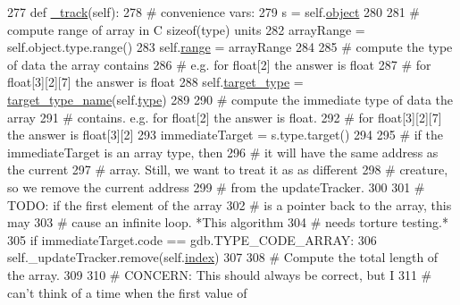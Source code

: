 \begin{DoxyCode}
277     \textcolor{keyword}{def }\hyperlink{classmemoryoracle_1_1instance_1_1Array_a1d8c3993d8a52bfbec8240d6f79b3ce1}{\_track}(self):
278         \textcolor{comment}{# convenience vars:}
279         s = self.\hyperlink{classmemoryoracle_1_1typed_1_1Typed_a0d1a3c7644d37da66f9ea5cb269115fe}{object}
280 
281         \textcolor{comment}{# compute range of array in C sizeof(type) units}
282         arrayRange = self.object.type.range()
283         self.\hyperlink{classmemoryoracle_1_1instance_1_1Array_acb456ee173f41d41e16e1bebfba48aa6}{range} = arrayRange
284 
285         \textcolor{comment}{# compute the type of data the array contains}
286         \textcolor{comment}{# e.g. for float[2] the answer is float}
287         \textcolor{comment}{# for float[3][2][7] the answer is float}
288         self.\hyperlink{classmemoryoracle_1_1instance_1_1Array_a23836ff62d41326159a9a47ad3813e38}{target\_type} = \hyperlink{namespacememoryoracle_1_1instance_a4b8eb263a612b709be51201fc0fa7b6c}{target\_type\_name}(self.\hyperlink{classmemoryoracle_1_1instance_1_1Memory_a17b9f6c0f548bf201e4fc636c133470b}{type})
289 
290         \textcolor{comment}{# compute the immediate type of data the array}
291         \textcolor{comment}{# contains.  e.g. for float[2] the answer is float.}
292         \textcolor{comment}{# for float[3][2][7] the answer is float[3][2]}
293         immediateTarget = s.type.target()
294 
295         \textcolor{comment}{# if the immediateTarget is an array type, then}
296         \textcolor{comment}{# it will have the same address as the current}
297         \textcolor{comment}{# array.  Still, we want to treat it as as different}
298         \textcolor{comment}{# creature, so we remove the current address}
299         \textcolor{comment}{# from the updateTracker.}
300 
301         \textcolor{comment}{# TODO: if the first element of the array}
302         \textcolor{comment}{# is a pointer back to the array, this may}
303         \textcolor{comment}{# cause an infinite loop.  *This algorithm}
304         \textcolor{comment}{# needs torture testing.*}
305         \textcolor{keywordflow}{if} immediateTarget.code == gdb.TYPE\_CODE\_ARRAY:
306             self.\_updateTracker.remove(self.\hyperlink{classmemoryoracle_1_1instance_1_1Memory_aba9e6136a3854e0ab59a74acd015be06}{index})
307 
308         \textcolor{comment}{# Compute the total length of the array.}
309 
310         \textcolor{comment}{# CONCERN: This should always be correct, but I}
311         \textcolor{comment}{# can't think of a time when the first value of}

\end{DoxyCode}
